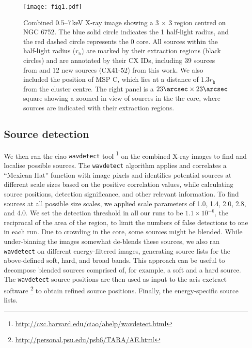 \documentclass[fleqn,usenatbib]{mnras}
\newcommand{\revised}[1]{{\color{black}{#1}}}
\begin{document}
\begin{figure*}
    \centering
    \texttt{[image: fig1.pdf]}
    \caption{Combined 0.5--7\,keV X-ray image showing a 3 $\times$ 3 region centred on NGC 6752. The blue solid circle indicates the 1 half-light radius, and the red dashed circle represents the 0 core. All sources within the half-light radius ($r_\mathrm{h}$) are marked by their extraction regions (black circles) and are annotated by their CX IDs, including 39 sources from \citet{Forestell14} and 12 new sources (CX41-52) from this work. We also included the position of MSP C, which lies at a distance of $1.3r_\mathrm{h}$ from the cluster centre. The right panel is a $23\arcsec\times 23\arcsec$ square showing a zoomed-in view of sources in the the core, where sources are indicated with their extraction regions.}
    \label{f:x_ray_img}
\end{figure*}

\subsection{Source detection}
We then ran the {\sc ciao} {\tt wavdetect} tool \citep{Freeman02}\footnote{\url{http://cxc.harvard.edu/ciao/ahelp/wavdetect.html}} on the combined X-ray images to find and localise possible sources. The {\tt wavdetect} algorithm applies and correlates a ``Mexican Hat'' function with image pixels and identifies potential sources at different scale sizes based on the positive correlation values, while calculating source positions, detection significance, and other relevant information. To find sources at all possible size scales, we applied scale parameters of 1.0, 1.4, 2.0, 2.8, and 4.0. We set the detection threshold in all our runs to be $1.1\times10^{-6}$, the reciprocal of the area of the region, to limit the numbers of false detections to one in each run. Due to crowding in the core, some sources might be blended. While under-binning the images somewhat de-blends these sources, we also ran {\tt wavdetect} on different energy-filtered images, generating source lists for the above-defined soft, hard, and broad bands. This approach can be useful to decompose blended sources comprised of, for example, a soft and a hard source. The {\tt wavdetect} source positions are then used as input to the {\sc acis-exctract} software \citep{Broos10}\footnote{\url{http://personal.psu.edu/psb6/TARA/AE.html}} to obtain refined source positions. Finally, \revised{we combined} the energy-specific source lists. %
\end{document}
